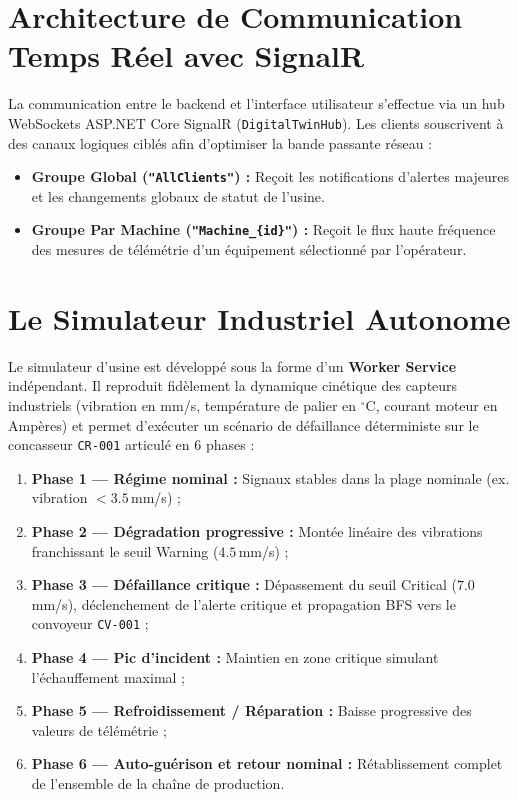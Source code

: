 \section{Architecture de Communication Temps Réel avec SignalR}

La communication entre le backend et l'interface utilisateur s'effectue via un hub WebSockets ASP.NET Core SignalR (\texttt{DigitalTwinHub}). Les clients souscrivent à des canaux logiques ciblés afin d'optimiser la bande passante réseau :

\begin{itemize}
    \item \textbf{Groupe Global (\texttt{"AllClients"}) :} Reçoit les notifications d'alertes majeures et les changements globaux de statut de l'usine.
    \item \textbf{Groupe Par Machine (\texttt{"Machine\_\{id\}"}) :} Reçoit le flux haute fréquence des mesures de télémétrie d'un équipement sélectionné par l'opérateur.
\end{itemize}

\section{Le Simulateur Industriel Autonome}

Le simulateur d'usine est développé sous la forme d'un \textbf{Worker Service} indépendant. Il reproduit fidèlement la dynamique cinétique des capteurs industriels (vibration en mm/s, température de palier en $^\circ$C, courant moteur en Ampères) et permet d'exécuter un scénario de défaillance déterministe sur le concasseur \texttt{CR-001} articulé en 6 phases :
\begin{enumerate}
    \item \textbf{Phase 1 --- Régime nominal :} Signaux stables dans la plage nominale (ex. vibration $< 3.5$\,mm/s) ;
    \item \textbf{Phase 2 --- Dégradation progressive :} Montée linéaire des vibrations franchissant le seuil Warning ($4.5$\,mm/s) ;
    \item \textbf{Phase 3 --- Défaillance critique :} Dépassement du seuil Critical ($7.0$\,mm/s), déclenchement de l'alerte critique et propagation BFS vers le convoyeur \texttt{CV-001} ;
    \item \textbf{Phase 4 --- Pic d'incident :} Maintien en zone critique simulant l'échauffement maximal ;
    \item \textbf{Phase 5 --- Refroidissement / Réparation :} Baisse progressive des valeurs de télémétrie ;
    \item \textbf{Phase 6 --- Auto-guérison et retour nominal :} Rétablissement complet de l'ensemble de la chaîne de production.
\end{enumerate}

